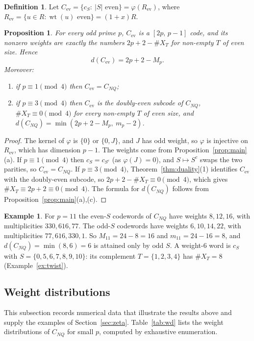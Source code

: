 \documentclass[12pt,letterpaper]{article}
\newtheorem{proposition}[theorem]{Proposition}
\theoremstyle{definition}
\newtheorem{definition}[theorem]{Definition}
\newtheorem{example}[theorem]{Example}
\theoremstyle{remark}
\numberwithin{equation}{section}
\newcommand{\wt}{\operatorname{wt}}
\newcommand{\CNQ}{C_{NQ}}
\newcommand{\Cev}{C_{\mathrm{ev}}}
\newcommand{\X}{\#X}
\begin{document}
\begin{definition}
Let $\Cev=\{c_S:\ |S|\text{ even}\}=\varphi(R_{\mathrm{ev}})$, where
$R_{\mathrm{ev}}=\{u\in R:\wt(u)\text{ even}\}=(1+x)R$.
\end{definition}

\begin{proposition}\label{prop:Cev}
For every odd prime $p$, $\Cev$ is a $[2p,\,p-1]$ code, and its nonzero weights are
exactly the numbers $2p+2-\X_T$ for non-empty $T$ of even size. Hence
\[
d(\Cev)=2p+2-M_p .
\]
Moreover:
\begin{enumerate}
\item if $p\equiv1\pmod4$ then $\Cev=\CNQ$;
\item if $p\equiv3\pmod4$ then $\Cev$ is the doubly-even subcode of $\CNQ$,
$\X_T\equiv0\pmod4$ for every non-empty $T$ of even size, and
$d(\CNQ)=\min(2p+2-M_p,\ m_p-2)$.
\end{enumerate}
\end{proposition}

\begin{proof}
The kernel of $\varphi$ is $\{0\}$ or $\{0,J\}$, and $J$ has odd weight, so
$\varphi$ is injective on $R_{\mathrm{ev}}$, which has dimension $p-1$. The weights
come from Proposition~\ref{prop:main}(a). If $p\equiv1\pmod4$ then
$c_S=c_{S^c}$ (as $\varphi(J)=0$), and $S\mapsto S^c$ swaps the two parities, so
$\Cev=\CNQ$. If $p\equiv3\pmod4$, Theorem~\ref{thm:duality}(1) identifies $\Cev$
with the doubly-even subcode, so $2p+2-\X_T\equiv0\pmod 4$, which gives
$\X_T\equiv 2p+2\equiv0\pmod 4$. The formula for $d(\CNQ)$ follows from
Proposition~\ref{prop:main}(a),(c).
\end{proof}

\begin{example}\label{ex:Cev11}
For $p=11$ the even-$S$ codewords of $\CNQ$ have weights $8,12,16$, with
multiplicities $330,616,77$. The odd-$S$ codewords have weights $6,10,14,22$, with
multiplicities $77,616,330,1$. So $M_{11}=24-8=16$ and $m_{11}=24-16=8$, and
$d(\CNQ)=\min(8,6)=6$ is attained only by odd $S$. A weight-$6$ word is
$c_S$ with $S=\{0,5,6,7,8,9,10\}$: its complement $T=\{1,2,3,4\}$ has $\X_T=8$
(Example~\ref{ex:twist}).
\end{example}

\subsection{Weight distributions}

This subsection records numerical data that illustrate the results above and supply
the examples of Section~\ref{sec:zeta}. Table~\ref{tab:wd} lists the weight
distributions of $\CNQ$ for small $p$, computed by exhaustive enumeration.
\end{document}
